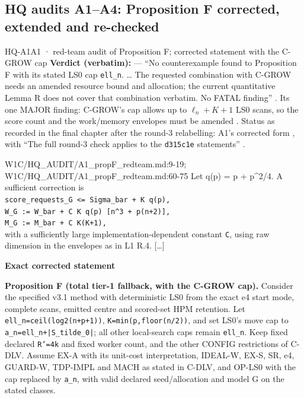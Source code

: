 \subsection{HQ audits A1--A4: Proposition F corrected, extended and re-checked}\label{sec:loop:hq}
\begin{card}{HQ-A1}{A1 · red-team audit of Proposition F; corrected statement with the C-GROW cap}
\textbf{Verdict (verbatim):}  — ``No counterexample found to Proposition F with its stated LS0 cap \texttt{ell\_n}. \ldots{} The requested combination with C-GROW needs an amended resource bound and allocation; the current quantitative Lemma R does not cover that combination verbatim. No FATAL finding'' . Its one MAJOR finding: C-GROW's cap allows up to $\ell_n+K+1$ LS0 scans, so the score count and the work/memory envelopes must be amended . Status as recorded in the final chapter after the round-3 relabelling: A1's corrected form , with ``The full round-3 check applies to the \texttt{d315c1e} statements'' .
\begin{stmt}{W1C/HQ_AUDIT/A1_propF_redteam.md:9-19; W1C/HQ_AUDIT/A1_propF_redteam.md:60-75}
Let q(p) = p + p\textasciicircum{}2/4. A sufficient correction is\\
\texttt{score\_requests\_G <= Sigma\_bar + K q(p),}\\
\texttt{W\_G := W\_bar + C K q(p) [n\textasciicircum{}3 + p(n+2)],}\\
\texttt{M\_G := M\_bar + C K(K+1),}\\
with a sufficiently large implementation-dependent constant \texttt{C}, using raw dimension in the envelopes as in L1 R.4. [\ldots]

\textbf{Exact corrected statement}

\textbf{Proposition F (total tier-1 fallback, with the C-GROW cap).} Consider the specified v3.1 method with deterministic LS0 from the exact e4 start mode, complete scans, emitted centre and scored-set HPM retention. Let \texttt{ell\_n=ceil(log2(n+p+1))}, \texttt{K=min(p,floor(n/2))}, and set LS0's move cap to \texttt{a\_n=ell\_n+|S\_tilde\_0|}; all other local-search caps remain \texttt{ell\_n}. Keep fixed declared \texttt{R'=4k} and fixed worker count, and the other CONFIG restrictions of C-DLV. Assume EX-A with its unit-cost interpretation, IDEAL-W, EX-S, SR, e4, GUARD-W, TDP-IMPL and MACH as stated in C-DLV, and OP-LS0 with the cap replaced by \texttt{a\_n}, with valid declared seed/allocation and model G on the stated classes.


\end{stmt}
\end{card}
